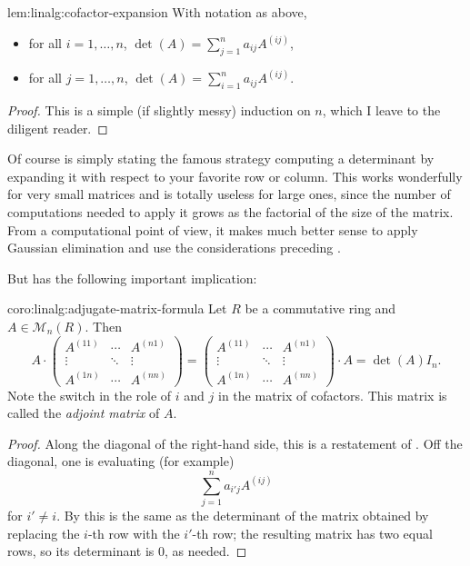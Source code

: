\begin{lem}{}{lem:linalg:cofactor-expansion}
  With notation as above,
  \begin{itemize}
  \item for all $i = 1, \dots, n$,
    $\det(A) = \sum_{j=1}^n a_{ij} A^{(ij)}$,
  \item for all $j = 1, \dots, n$,
    $\det(A) = \sum_{i=1}^n a_{ij} A^{(ij)}$.
  \end{itemize}
\end{lem}
\begin{proof}
  This is a simple (if slightly messy) induction on $n$, which I leave
  to the diligent reader.
\end{proof}

Of course  is simply stating the famous strategy
computing a determinant by expanding it with respect to your favorite
row or column. This works wonderfully for very small matrices and is
totally useless for large ones, since the number of computations
needed to apply it grows as the factorial of the size of the
matrix. From a computational point of view, it makes much better sense
to apply Gaussian elimination and use the considerations preceding
.

But  has the following important implication:
\begin{coro}{}{coro:linalg:adjugate-matrix-formula}
  Let $R$ be a commutative ring and $A \in \mathcal{M}_n(R)$. Then
  \[
    A \cdot
    \begin{pmatrix}
      A^{(11)} & \cdots & A^{(n1)} \\
      \vdots & \ddots & \vdots \\
      A^{(1n)} & \cdots & A^{(nn)}
    \end{pmatrix}
    =
    \begin{pmatrix}
      A^{(11)} & \cdots & A^{(n1)} \\
      \vdots & \ddots & \vdots \\
      A^{(1n)} & \cdots & A^{(nn)}
    \end{pmatrix}
    \cdot A = \det(A) I_n.
  \]
  Note the switch in the role of $i$ and $j$ in the matrix of
  cofactors.  This matrix is called the \emph{adjoint matrix} of $A$.
\end{coro}
\begin{proof}
  Along the diagonal of the right-hand side, this is a restatement of
  . Off the diagonal, one is evaluating (for example)
  \[
    \sum_{j=1}^n a_{i'j} A^{(ij)}
  \]
  for $i' \neq i$. By  this is the same as the
  determinant of the matrix obtained by replacing the $i$-th row with
  the $i'$-th row; the resulting matrix has two equal rows, so its
  determinant is $0$, as needed.
\end{proof}

